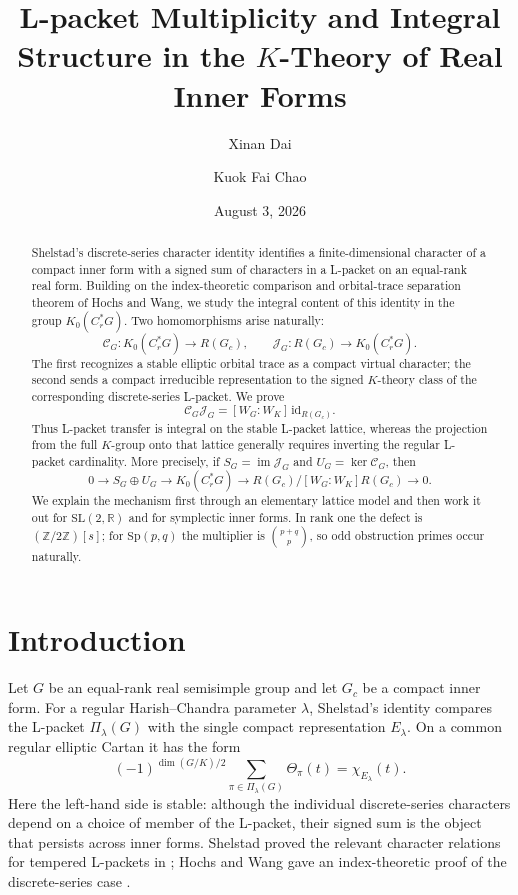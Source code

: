 \documentclass[11pt]{amsart}
\title[L-packet Multiplicity and Integral Structure]
{ L-packet Multiplicity and Integral Structure in the $K$-Theory of Real Inner Forms}
\author{Xinan Dai}
\author{Kuok Fai Chao}
\date{August 3, 2026}
\theoremstyle{definition}
\theoremstyle{remark}
\begin{document}
\begin{abstract}
Shelstad's discrete-series character identity identifies a finite-dimensional
character of a compact inner form with a signed sum of characters in a L-packet
on an equal-rank real form.  Building on the index-theoretic comparison and
orbital-trace separation theorem of Hochs and Wang, we study the integral
content of this identity in the group
\(K_0(C_r^*G)\).  Two homomorphisms arise naturally:
\[
  \mathcal C_G:K_0(C_r^*G)\longrightarrow R(G_c),
  \qquad
  \mathcal J_G:R(G_c)\longrightarrow K_0(C_r^*G).
\]
The first recognizes a stable elliptic orbital trace as a compact virtual
character; the second sends a compact irreducible representation to the signed
\(K\)-theory class of the corresponding discrete-series L-packet.  We prove
\[
  \mathcal C_G\mathcal J_G=[W_G:W_K]\,\mathrm{id}_{R(G_c)}.
\]
Thus L-packet transfer is integral on the stable L-packet lattice, whereas the
projection from the full \(K\)-group onto that lattice generally requires
inverting the regular L-packet cardinality.  More precisely, if
\(S_G=\operatorname{im}\mathcal J_G\) and
\(U_G=\ker\mathcal C_G\), then
\[
  0\longrightarrow S_G\oplus U_G\longrightarrow K_0(C_r^*G)
  \longrightarrow R(G_c)/[W_G:W_K]R(G_c)\longrightarrow0.
\]
We explain the mechanism first through an elementary lattice model and then
work it out for \(\mathrm{SL}(2,\mathbb R)\) and for symplectic inner forms.  In
rank one the defect is \((\mathbb Z/2\mathbb Z)[s]\); for
\(\mathrm{Sp}(p,q)\) the multiplier is \(\binom{p+q}{p}\), so odd obstruction
primes occur naturally.
\end{abstract}

\maketitle

\section{Introduction}

Let \(G\) be an equal-rank real semisimple group and let \(G_c\) be a compact
inner form.  For a regular Harish--Chandra parameter \(\lambda\), Shelstad's
identity compares the L-packet \(\Pi_\lambda(G)\) with the single compact
representation \(E_\lambda\).  On a common regular elliptic Cartan it has the
form
\begin{equation}\label{eq:intro-shelstad}
  (-1)^{\dim(G/K)/2}
  \sum_{\pi\in\Pi_\lambda(G)}\Theta_\pi(t)
  =\chi_{E_\lambda}(t).
\end{equation}
Here the left-hand side is stable: although the individual discrete-series
characters depend on a choice of member of the L-packet, their signed sum is the
object that persists across inner forms.  Shelstad proved the relevant
character relations for tempered L-packets in \cite[Theorem~6.3]{Shelstad1979};
Hochs and Wang gave an index-theoretic proof of the discrete-series case
\cite[Theorem~2.8]{HochsWang2018Shelstad}.
\end{document}

